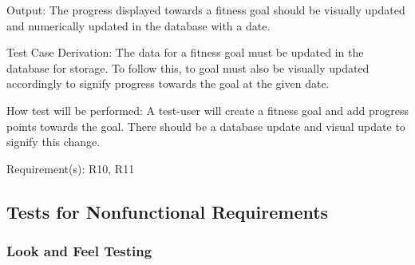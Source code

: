 \documentclass[12pt, titlepage]{article}
\begin{document}
\begin{enumerate}
		Output: The progress displayed towards a fitness goal should be visually updated and numerically updated in the database with a date.
		
		Test Case Derivation: The data for a fitness goal must be updated in the database for storage. To follow this, to goal must also be visually updated accordingly to signify progress towards the goal at the given date.
		
		How test will be performed: A test-user will create a fitness goal and add progress points towards the goal. There should be a database update and visual update to signify this change.
		
		Requirement(s): R10, R11
		
		
	\end{enumerate}

	
	\subsection{Tests for Nonfunctional Requirements}
	
	
	
	
	\subsubsection{Look and Feel Testing}
	
\end{document}
